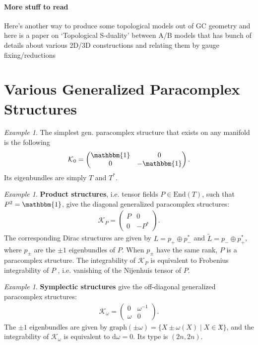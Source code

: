 \documentclass{article}
\newcommand{\KK}{\mathcal{K}}
\newcommand{\XX}{\mathfrak{X}}
\newcommand{\id}{{\mathbbm{1}}}
\newcommand{\rd}{\mathrm{d}}
\newcommand{\Lt}{{\tl{L}}}
\newcommand{\Endo}{\text{End}}
\def\tl{\tilde}
\theoremstyle{definition}
\theoremstyle{definition}
\theoremstyle{remark}
\newtheorem{Ex}[theorem]{Example}
\theoremstyle{ref}
\begin{document}
\paragraph*{More stuff to read}
Here's another way to produce some topological models out of GC geometry \cite{Ikeda:2007rn} and here is a paper on `Topological S-duality' between A/B models that has bunch of details about various 2D/3D constructions and relating them by gauge fixing/reductions \cite{Kokenyesi:2018xgj}

\section*{Various Generalized Paracomplex Structures}
\begin{Ex}
The simplest gen. paracomplex structure that exists on any manifold is the following
\begin{align*}
\KK_0=
\begin{pmatrix}
\id & 0 \\
0 & -\id
\end{pmatrix}.
\end{align*}
Its eigenbundles are simply $T$ and $T^*$.
\end{Ex}

\begin{Ex}
\textbf{Product structures}, i.e. tensor fields $P\in \Endo(T)$, such that $P^2=\id$, give the diagonal generalized paracomplex structures:
\begin{align*}
\KK_P=
\begin{pmatrix}
P & 0 \\
0 & -P^*
\end{pmatrix}.
\end{align*}
The corresponding Dirac structures are given by $L=p_+\oplus p^*_-$ and $\Lt=p_-\oplus p^*_+$, where $p_\pm$ are the $\pm 1$ eigenbundles of $P$. When $p_\pm$ have the same rank, $P$ is a paracomplex structure. The integrability of $\KK_P$ is equivalent to Frobenius integrability of $P$ , i.e. vanishing of the Nijenhuis tensor of $P$.
\end{Ex}

\begin{Ex}\label{ex:A-model}
\textbf{Symplectic structures} give the off-diagonal generalized paracomplex structures:
\begin{align*}
\KK_\omega=
\begin{pmatrix}
0 & \omega^{-1} \\
\omega & 0
\end{pmatrix}.
\end{align*}
The $\pm 1$ eigenbundles are given by $\text{graph}(\pm\omega)=\{X\pm\omega(X)\mid X\in \XX\}$, and the integrability of $\KK_\omega$ is equivalent to $\rd\omega=0$. Its type is $(2n,2n)$.
\end{Ex}
\end{document}
